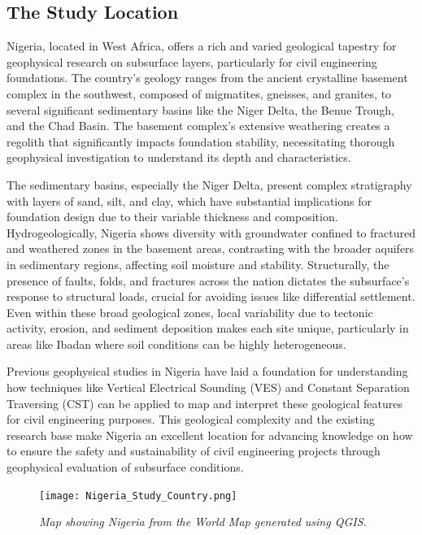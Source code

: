 \documentclass[12pt,a4paper]{report}
\begin{document}
\subsection{The Study Location}
Nigeria, located in West Africa, offers a rich and varied geological tapestry for geophysical research on subsurface layers, particularly for civil engineering foundations. The country's geology ranges from the ancient crystalline basement complex in the southwest, composed of migmatites, gneisses, and granites, to several significant sedimentary basins like the Niger Delta, the Benue Trough, and the Chad Basin. The basement complex's extensive weathering creates a regolith that significantly impacts foundation stability, necessitating thorough geophysical investigation to understand its depth and characteristics.

The sedimentary basins, especially the Niger Delta, present complex stratigraphy with layers of sand, silt, and clay, which have substantial implications for foundation design due to their variable thickness and composition. Hydrogeologically, Nigeria shows diversity with groundwater confined to fractured and weathered zones in the basement areas, contrasting with the broader aquifers in sedimentary regions, affecting soil moisture and stability. Structurally, the presence of faults, folds, and fractures across the nation dictates the subsurface's response to structural loads, crucial for avoiding issues like differential settlement. Even within these broad geological zones, local variability due to tectonic activity, erosion, and sediment deposition makes each site unique, particularly in areas like Ibadan where soil conditions can be highly heterogeneous.

Previous geophysical studies in Nigeria have laid a foundation for understanding how techniques like Vertical Electrical Sounding (VES) and Constant Separation Traversing (CST) can be applied to map and interpret these geological features for civil engineering purposes. This geological complexity and the existing research base make Nigeria an excellent location for advancing knowledge on how to ensure the safety and sustainability of civil engineering projects through geophysical evaluation of subsurface conditions. \\

\begin{figure}[h]
    \centering
    \texttt{[image: Nigeria\_Study\_Country.png]}
    \caption{\textit{Map showing Nigeria from the World Map generated using QGIS.}}
\end{figure}
\end{document}
